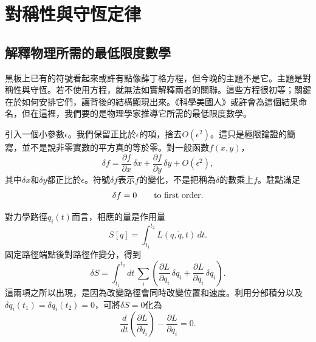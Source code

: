 \chapter{對稱性與守恆定律}


\section{解釋物理所需的最低限度數學}

黑板上已有的符號看起來或許有點像薛丁格方程，但今晚的主題不是它。主題是對稱性與守恆。若不使用方程，就無法如實解釋兩者的關聯。這些方程很初等；關鍵在於如何安排它們，讓背後的結構顯現出來。《科學美國人》或許會為這個結果命名，但在這裡，我們要的是物理學家推導它所需的最低限度數學。

引入一個小參數\(\epsilon\)。我們保留正比於\(\epsilon\)的項，捨去\(O(\epsilon^2)\)。這只是極限論證的簡寫，並不是說非零實數的平方真的等於零。對一般函數\(f(x,y)\)，
\begin{equation}
  \delta f
  =\frac{\partial f}{\partial x}\,\delta x
   +\frac{\partial f}{\partial y}\,\delta y
   +O(\epsilon^2),
  \label{eq:first-variation-f}
\end{equation}
其中\(\delta x\)和\(\delta y\)都正比於\(\epsilon\)。符號\(\delta f\)表示\(f\)的變化，不是把稱為\(\delta\)的數乘上\(f\)。駐點滿足
\begin{equation}
  \delta f=0
  \qquad\hbox{to first order.}
  \label{eq:stationary-f}
\end{equation}

對力學路徑\(q_i(t)\)而言，相應的量是作用量
\begin{equation}
  S[q]=\int_{t_1}^{t_2}L(q,\dot q,t)\,dt.
  \label{eq:action-l4}
\end{equation}
固定路徑端點後對路徑作變分，得到
\begin{equation}
  \delta S
  =\int_{t_1}^{t_2}dt\,
   \sum_i\left(
     \frac{\partial L}{\partial q_i}\,\delta q_i
     +\frac{\partial L}{\partial\dot q_i}\,\delta\dot q_i
   \right).
  \label{eq:action-variation-l4}
\end{equation}
這兩項之所以出現，是因為改變路徑會同時改變位置和速度。利用分部積分以及
\(\delta q_i(t_1)=\delta q_i(t_2)=0\)，可將\(\delta S=0\)化為
\begin{equation}
  \frac{d}{dt}\left(\frac{\partial L}{\partial\dot q_i}\right)
  -\frac{\partial L}{\partial q_i}=0.
  \label{eq:el-l4}
\end{equation}

